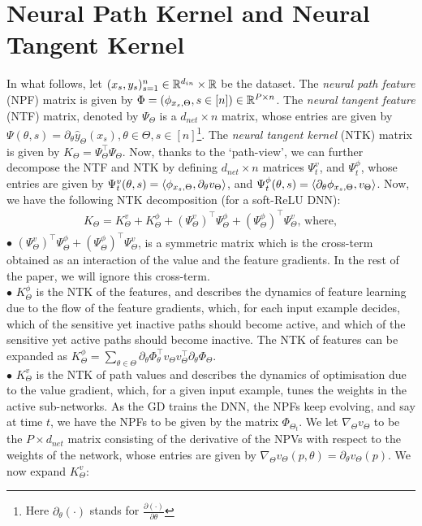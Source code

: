 \section{Neural Path Kernel and Neural Tangent Kernel}\label{sec:kernels}
In what follows, let $(x_s,y_s)_{s=1}^n\in\mathbb{R}^{d_{in}}\times\mathbb{R}$ be the dataset. The \emph{neural path feature} (NPF) matrix is given by $\Phi=(\phi_{x_s,\Theta},s\in[n])\in\mathbb{R}^{P\times n}$. The \emph{neural tangent feature} (NTF) matrix, denoted by $\Psi_{\Theta}$ is a $d_{net}\times n$ matrix, whose entries are given by $\Psi(\theta,s)=\partial_{\theta} \hat{y}_{\Theta}(x_s),\theta\in\Theta, s\in[n]$\footnote{Here $\partial_{\theta}(\cdot)$ stands for $\frac{\partial (\cdot)}{\partial \theta}$}. The \emph{neural tangent kernel} (NTK) matrix is given by $K_{\Theta}=\Psi_{\Theta}^\top\Psi_{\Theta}$. Now, thanks to the `path-view', we can further decompose the NTF and NTK by defining $d_{net}\times n$ matrices $\Psi^v_t$, and $\Psi^{\phi}_t$, whose entries are given by $\Psi^v_t(\theta,s)=\langle \phi_{x_s,\Theta},\partial_{\theta}v_{\Theta}\rangle$, and  $\Psi^{\phi}_t(\theta,s)=\langle \partial_{\theta}\phi_{x_s,\Theta}, v_{\Theta}\rangle$. Now, we have the following NTK decomposition (for a soft-ReLU DNN):
\begin{align}
K_{\Theta}=K^v_{\Theta}+K^{\phi}_{\Theta}+(\Psi^v_\Theta)^\top \Psi^{\phi}_{\Theta} +(\Psi^{\phi}_\Theta)^\top \Psi^{v}_{\Theta},\,\text{where},
\end{align}
$\bullet$ $(\Psi^v_\Theta)^\top \Psi^{\phi}_{\Theta} +(\Psi^{\phi}_\Theta)^\top \Psi^{v}_{\Theta}$, is a symmetric matrix which is the cross-term obtained as an interaction of the value and the feature gradients. In the rest of the paper, we will ignore this cross-term.\\
$\bullet$ $K^{\phi}_{\Theta}$ is the NTK of the features, and describes the dynamics of feature learning due to the flow of the feature gradients, which, for each input example decides, which of the sensitive yet inactive paths should become active, and which of the sensitive yet active paths should become inactive. The NTK of features can be expanded as $K^{\phi}_{\Theta}=\sum_{\theta \in \Theta}\partial_{\theta} \Phi^\top_{\theta}v_{\Theta}v^\top_{\Theta}\partial_{\theta}\Phi_{\Theta}$.\\ 
$\bullet$ $K^v_{\Theta}$ is the NTK of path values and describes the dynamics of optimisation due to the value gradient, which, for a given input example, tunes the weights in the active sub-networks. As the GD trains the DNN, the NPFs keep evolving, and say at time $t$, we have the NPFs to be given by the matrix $\Phi_{\Theta_t}$. We let $\nabla_{\Theta}v_{\Theta}$ to be the $P\times d_{net}$ matrix consisting of the derivative of the NPVs with respect to the weights of the network, whose entries are given by $\nabla_{\Theta}v_{\Theta}(p,\theta)=\partial_{\theta}v_{\Theta}(p)$. We now expand $K^v_{\Theta}$:
